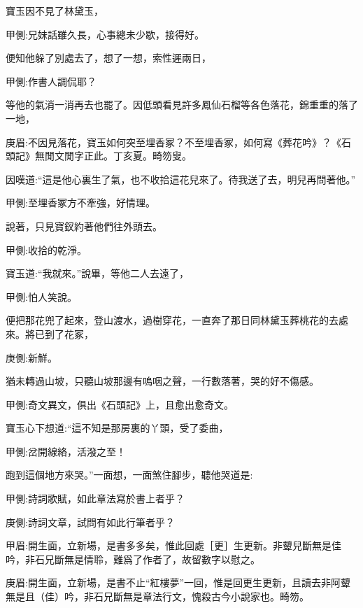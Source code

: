 \begin{parag}
    寶玉因不見了林黛玉，\begin{note}甲側:兄妹話雖久長，心事總未少歇，接得好。\end{note}便知他躲了別處去了，想了一想，索性遲兩日，\begin{note}甲側:作書人調侃耶？\end{note}等他的氣消一消再去也罷了。因低頭看見許多鳳仙石榴等各色落花，錦重重的落了一地，\begin{note}庚眉:不因見落花，寶玉如何突至埋香冢？不至埋香冢，如何寫《葬花吟》？《石頭記》無閒文閒字正此。丁亥夏。畸笏叟。\end{note}因嘆道:“這是他心裏生了氣，也不收拾這花兒來了。待我送了去，明兒再問著他。”\begin{note}甲側:至埋香冢方不牽強，好情理。\end{note}說著，只見寶釵約著他們往外頭去。\begin{note}甲側:收拾的乾淨。\end{note}寶玉道:“我就來。”說畢，等他二人去遠了，\begin{note}甲側:怕人笑說。\end{note}便把那花兜了起來，登山渡水，過樹穿花，一直奔了那日同林黛玉葬桃花的去處來。將已到了花冢，\begin{note}庚側:新鮮。\end{note}猶未轉過山坡，只聽山坡那邊有嗚咽之聲，一行數落著，哭的好不傷感。\begin{note}甲側:奇文異文，俱出《石頭記》上，且愈出愈奇文。\end{note}寶玉心下想道:“這不知是那房裏的丫頭，受了委曲，\begin{note}甲側:岔開線絡，活潑之至！\end{note}跑到這個地方來哭。”一面想，一面煞住腳步，聽他哭道是:\begin{note}甲側:詩詞歌賦，如此章法寫於書上者乎？\end{note}\begin{note}庚側:詩詞文章，試問有如此行筆者乎？\end{note}\begin{note}甲眉:開生面，立新場，是書多多矣，惟此回處［更］生更新。非顰兒斷無是佳吟，非石兄斷無是情聆，難爲了作者了，故留數字以慰之。\end{note}\begin{note}庚眉:開生面，立新場，是書不止“紅樓夢”一回，惟是回更生更新，且讀去非阿顰無是且（佳）吟，非石兄斷無是章法行文，愧殺古今小說家也。畸笏。\end{note}
\end{parag}


